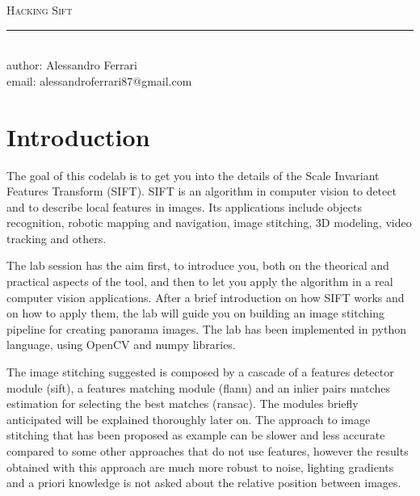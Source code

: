 \documentclass[aps,letterpaper,10pt]{revtex4}
\makeatletter
\newcommand{\labtitle}{Hacking Sift}
\newcommand{\authorname}{Alessandro Ferrari}
\newcommand{\emailauthor}{alessandroferrari87@gmail.com}
\makeatother
\begin{document}


\begin{titlepage}
\begin{center}
{\Large \textsc{\labtitle} \\ \vspace{4pt}} 
\rule[13pt]{\textwidth}{1pt} \\ \vspace{150pt}
{\large author: \authorname \\ \vspace{10pt}
email: \emailauthor \\ \vspace{10pt}
\vspace{10pt}}
\end{center}
\end{titlepage}





\section{Introduction}
The goal of this codelab is to get you into the details of the Scale Invariant Features Transform (SIFT). SIFT is an algorithm in computer vision to detect and to describe local features in images. Its applications include objects recognition, robotic mapping and navigation, image stitching, 3D modeling, video tracking and others. \vspace{3mm}

The lab session has the aim first, to introduce you, both on the theorical and practical aspects of the tool, and then to let you apply the algorithm in a real computer vision applications. After a brief introduction on how SIFT works and on how to apply them, the lab will guide you on building an image stitching pipeline for creating panorama images. The lab has been implemented in python language, using OpenCV and numpy libraries. \vspace{3mm} %

The image stitching suggested is composed by a cascade of a features detector module (sift), a features matching module (flann) and an inlier pairs matches estimation for selecting the best matches (ransac). The modules briefly anticipated will be explained thoroughly later on. The approach to image stitching that has been proposed as example can be slower and less accurate compared to some other approaches that do not use features, however the results obtained with this approach are much more robust to noise, lighting gradients and a priori knowledge is not asked about the relative position between images.  
\vspace{3mm}  
\end{document}
